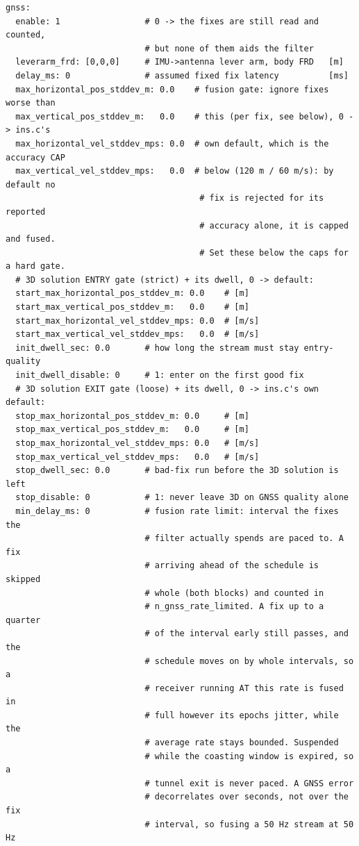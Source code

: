 \documentclass[11pt,a4paper]{article}
\begin{document}
\begin{lstlisting}[style=cfg]
gnss:
  enable: 1                 # 0 -> the fixes are still read and counted,
                            # but none of them aids the filter
  leverarm_frd: [0,0,0]     # IMU->antenna lever arm, body FRD   [m]
  delay_ms: 0               # assumed fixed fix latency          [ms]
  max_horizontal_pos_stddev_m: 0.0    # fusion gate: ignore fixes worse than
  max_vertical_pos_stddev_m:   0.0    # this (per fix, see below), 0 -> ins.c's
  max_horizontal_vel_stddev_mps: 0.0  # own default, which is the accuracy CAP
  max_vertical_vel_stddev_mps:   0.0  # below (120 m / 60 m/s): by default no
                                       # fix is rejected for its reported
                                       # accuracy alone, it is capped and fused.
                                       # Set these below the caps for a hard gate.
  # 3D solution ENTRY gate (strict) + its dwell, 0 -> default:
  start_max_horizontal_pos_stddev_m: 0.0    # [m]
  start_max_vertical_pos_stddev_m:   0.0    # [m]
  start_max_horizontal_vel_stddev_mps: 0.0  # [m/s]
  start_max_vertical_vel_stddev_mps:   0.0  # [m/s]
  init_dwell_sec: 0.0       # how long the stream must stay entry-quality
  init_dwell_disable: 0     # 1: enter on the first good fix
  # 3D solution EXIT gate (loose) + its dwell, 0 -> ins.c's own default:
  stop_max_horizontal_pos_stddev_m: 0.0     # [m]
  stop_max_vertical_pos_stddev_m:   0.0     # [m]
  stop_max_horizontal_vel_stddev_mps: 0.0   # [m/s]
  stop_max_vertical_vel_stddev_mps:   0.0   # [m/s]
  stop_dwell_sec: 0.0       # bad-fix run before the 3D solution is left
  stop_disable: 0           # 1: never leave 3D on GNSS quality alone
  min_delay_ms: 0           # fusion rate limit: interval the fixes the
                            # filter actually spends are paced to. A fix
                            # arriving ahead of the schedule is skipped
                            # whole (both blocks) and counted in
                            # n_gnss_rate_limited. A fix up to a quarter
                            # of the interval early still passes, and the
                            # schedule moves on by whole intervals, so a
                            # receiver running AT this rate is fused in
                            # full however its epochs jitter, while the
                            # average rate stays bounded. Suspended
                            # while the coasting window is expired, so a
                            # tunnel exit is never paced. A GNSS error
                            # decorrelates over seconds, not over the fix
                            # interval, so fusing a 50 Hz stream at 50 Hz

\end{lstlisting}
\end{document}
